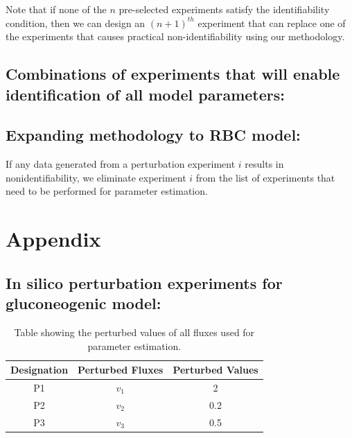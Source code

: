 \documentclass[10pt]{article}
\begin{document}
Note that if none of the $n$ pre-selected experiments satisfy the identifiability condition, then we can design an $(n+1)^{th}$ experiment that can replace one of the experiments that causes practical non-identifiability using our methodology. 

\subsection{Combinations of experiments that will enable identification of all model parameters:}

\subsection{Expanding methodology to RBC model:}
If any data generated from a perturbation experiment $i$ results in nonidentifiability, we eliminate experiment $i$ from the list of experiments that need to be performed for parameter estimation.

\section*{Appendix}
\subsection*{In silico perturbation experiments for gluconeogenic model:}
\begin{table}[!tbhp]
	\caption{Table showing the perturbed values of all fluxes used for parameter estimation.}
	\begin{center}				
		\begin{tabular}{ccc}
			Designation & Perturbed Fluxes & Perturbed Values\\
			\hline
			P1 & $v_1$ & 2\\
			P2 & $v_2$ & 0.2\\
			P3 & $v_3$ & 0.5
		\end{tabular}
	\end{center}	
	\label{tab:pval}
\end{table}



\printbibliography
\end{document}
